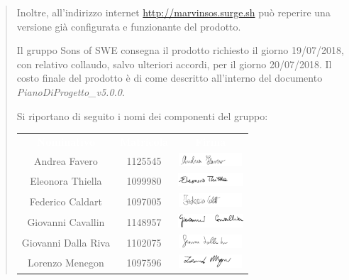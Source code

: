 \documentclass{letter}
\newcommand{\PdP}{\emph{PianoDiProgetto\_v5.0.0}}
\begin{document}
\begin{letter}
\begin{quotation}
	\newpage
	Inoltre, all’indirizzo internet \url{http://marvinsos.surge.sh} può reperire
una versione già configurata e funzionante del prodotto.
	
	
	Il gruppo Sons of SWE consegna il prodotto richiesto il giorno 19/07/2018, con relativo collaudo, salvo ulteriori accordi, per il giorno 20/07/2018. Il costo finale del prodotto è di  come descritto all'interno del documento \PdP{}.
	
	Si riportano di seguito i nomi dei componenti del gruppo:\\
	\begin{longtable}{ c  c  c }
		\rowcolor{greySOS}
		\textcolor{white}{\textbf{Nominativo}} & \textcolor{white}{\textbf{Matricola}} & \textcolor{white}{\textbf{Firma}}\\
		Andrea Favero & 1125545 & \includegraphics[height=0.5cm]{firme/AndreaFavero.png} \\
		
		Eleonora Thiella & 1099980 & \includegraphics[height=0.5cm]{firme/EleonoraThiella.png} \\
		
		Federico Caldart & 1097005 & \includegraphics[height=0.5cm]{firme/FedericoCaldart.png} \\
		
		Giovanni Cavallin & 1148957 & \includegraphics[height=0.5cm]{firme/GiovanniCavallin.png} \\
		
		Giovanni Dalla Riva & 1102075 & \includegraphics[height=0.5cm]{firme/GiovanniDallaRiva.png} \\
		
		Lorenzo Menegon & 1097596 & \includegraphics[height=0.5cm]{firme/LorenzoMenegon.png} \\
		

\end{longtable}
\end{quotation}
\end{letter}
\end{document}
